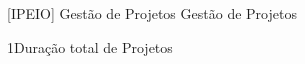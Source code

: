 \documentclass[\mainfilename]{subfiles}
\begin{document}
\graphicspath{{\subfix{./.build/figures/IPEIO-Slides_Anotações.2023.2.4/}}}

[IPEIO]
{Gestão de Projetos} %
{Gestão de Projetos} %

\begin{sectionBox}1{Duração total de Projetos} %
    
    \begin{center}
    \end{center}
    
\end{sectionBox}
\end{document}
